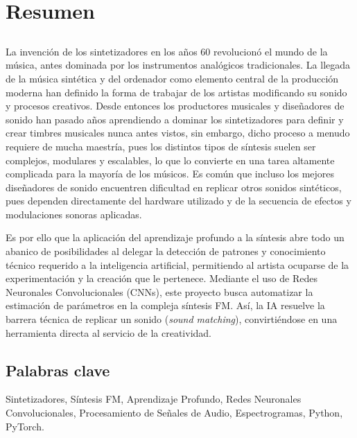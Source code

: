 \chapter*{Resumen}

\section*{\tituloPortadaVal}

La invención de los sintetizadores en los años 60 revolucionó el mundo de la música, antes dominada por los instrumentos analógicos tradicionales. La llegada de la música sintética y del ordenador como elemento central de la producción moderna han definido la forma de trabajar de los artistas modificando su sonido y procesos creativos. Desde entonces los productores musicales y diseñadores de sonido han pasado años aprendiendo a dominar los sintetizadores para definir y crear timbres musicales nunca antes vistos, sin embargo, dicho proceso a menudo requiere de mucha maestría, pues los distintos tipos de síntesis suelen ser complejos, modulares y escalables, lo que lo convierte en una tarea altamente complicada para la mayoría de los músicos. Es común que incluso los mejores diseñadores de sonido encuentren dificultad en replicar otros sonidos sintéticos, pues dependen directamente del hardware utilizado y de la secuencia de efectos y modulaciones sonoras aplicadas.

Es por ello que la aplicación del aprendizaje profundo a la síntesis abre todo un abanico de posibilidades al delegar la detección de patrones y conocimiento técnico requerido a la inteligencia artificial, permitiendo al artista ocuparse de la experimentación y la creación que le pertenece. Mediante el uso de Redes Neuronales Convolucionales (CNNs), este proyecto busca automatizar la estimación de parámetros en la compleja síntesis FM. Así, la IA resuelve la barrera técnica de replicar un sonido (\textit{sound matching}), convirtiéndose en una herramienta directa al servicio de la creatividad.

\vspace{1em} 

\section*{Palabras clave}
   
\noindent Sintetizadores, Síntesis FM, Aprendizaje Profundo, Redes Neuronales Convolucionales, Procesamiento de Señales de Audio, Espectrogramas, Python, PyTorch.





